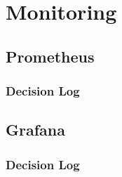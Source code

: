 \section{Monitoring}
\subsection{Prometheus}
\subsubsection{Decision Log}

\subsection{Grafana}
\subsubsection{Decision Log}
